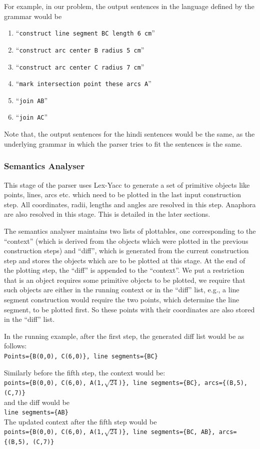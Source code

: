 \def\DevnagVersion{2.15}\documentclass[12pt]{article}
\begin{document}
For example, in our problem, the output sentences in the language defined by the grammar would be
\begin{enumerate}
\item ``\texttt{construct line segment BC length 6 cm}''
\item ``\texttt{construct arc center B radius 5 cm}''
\item ``\texttt{construct arc center C radius 7 cm}''
\item ``\texttt{mark intersection point these arcs A}''
\item ``\texttt{join AB}''
\item ``\texttt{join AC}''
\end{enumerate}

Note that, the output sentences for the hindi sentences would be the same, as the underlying grammar in which the parser tries to fit the sentences is the same.

\subsubsection{Semantics Analyser}
This stage of the parser uses Lex-Yacc to generate a set of primitive objects like points, lines, arcs etc. which need to be plotted in the last input construction step. All coordinates, radii, lengths and angles are resolved in this step. Anaphora are also resolved in this stage. This is detailed in the later sections.

The semantics analyser maintains two lists of plottables, one corresponding to the ``context'' (which is derived from the objects which were plotted in the previous construction steps) and ``diff'', which is generated from the current construction step and stores the objects which are to be plotted at this stage. At the end of the plotting step, the ``diff'' is appended to the ``context''. We put a restriction that is an object requires some primitive objects to be plotted, we require that such objects are either in the running context or in the ``diff'' list, e.g., a line segment construction would require the two points, which determine the line segment, to be plotted first. So these points with their coordinates are also stored in the ``diff'' list.

In the running example, after the first step, the generated diff list would be as follows:\\
\texttt{Points=\{B(0,0), C(6,0)\}, line segments=\{BC\}}

Similarly before the fifth step, the context would be:\\
\texttt{points=\{B(0,0), C(6,0), A(1,$\surd{24}$)\}, line segments=\{BC\}, arcs=\{(B,5), (C,7)\}}\\
and the diff would be\\
\texttt{line segments=\{AB\}}\\
The updated context after the fifth step would be\\
\texttt{points=\{B(0,0), C(6,0), A(1,$\surd{24}$)\}, line segments=\{BC, AB\}, arcs=\{(B,5), (C,7)\}}
\end{document}
